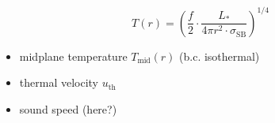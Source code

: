     \begin{equation}
    \boxed{
        T(r) = \left(
            \frac{f}{2}\cdot
            \frac{L_*}{4\pi r^2 \cdot \sigma_\text{SB}}
        \right)^{1/4}
    }
    \end{equation}

    

    \begin{itemize}
        \item midplane temperature $T_\text{mid}(r)$ (b.c. isothermal) \\
        \item thermal velocity $u_\text{th}$ \\
        \item sound speed (here?)
    \end{itemize}
